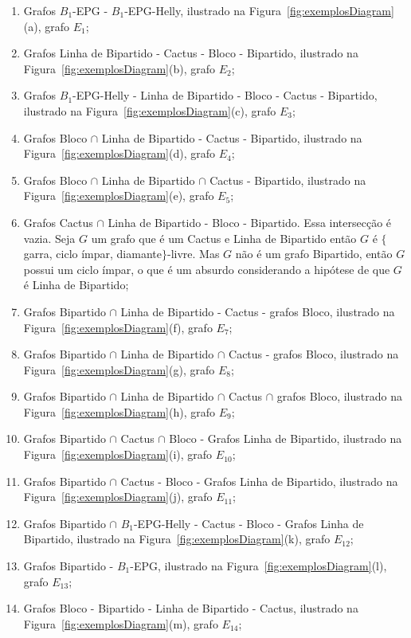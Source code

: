 \begin{enumerate}[label=(\arabic*)]
    \item Grafos $B_1$-EPG  - $B_1$-EPG-Helly, ilustrado na Figura~\ref{fig:exemplosDiagram}(a), grafo $E_1$;%
    
    \item Grafos Linha de Bipartido  - Cactus - Bloco - Bipartido, ilustrado na Figura~\ref{fig:exemplosDiagram}(b), grafo $E_2$;%
    \item Grafos $B_1$-EPG-Helly - Linha de Bipartido - Bloco - Cactus - Bipartido, ilustrado na Figura~\ref{fig:exemplosDiagram}(c), grafo $E_3$;%
    \item Grafos Bloco $\cap$ Linha de Bipartido - Cactus - Bipartido, ilustrado na Figura~\ref{fig:exemplosDiagram}(d), grafo $E_4$;%
    \item Grafos Bloco $\cap$ Linha de Bipartido $\cap$  Cactus - Bipartido, ilustrado na Figura~\ref{fig:exemplosDiagram}(e), grafo $E_5$;%
    \item Grafos Cactus $\cap$ Linha de Bipartido - Bloco - Bipartido. Essa intersecção é vazia. Seja $G$ um grafo que é um Cactus e Linha de Bipartido então $G$ é $\{$garra, ciclo ímpar, diamante$\}$-livre. Mas $G$ não é um grafo Bipartido, então $G$ possui um ciclo ímpar, o que é um absurdo considerando a hipótese de que $G$ é Linha de Bipartido; %
    \item Grafos Bipartido $\cap$ Linha de Bipartido  - Cactus - grafos Bloco, ilustrado na Figura~\ref{fig:exemplosDiagram}(f), grafo $E_7$;%
    \item Grafos Bipartido $\cap$ Linha de Bipartido $\cap$  Cactus - grafos Bloco, ilustrado na Figura~\ref{fig:exemplosDiagram}(g), grafo $E_8$;%
    \item Grafos Bipartido $\cap$ Linha de Bipartido $\cap$  Cactus $\cap$ grafos Bloco, ilustrado na Figura~\ref{fig:exemplosDiagram}(h), grafo $E_9$;%
  \item Grafos Bipartido $\cap$  Cactus $\cap$ Bloco - Grafos Linha de Bipartido, ilustrado na Figura~\ref{fig:exemplosDiagram}(i), grafo $E_{10}$;%
    \item Grafos Bipartido  $\cap$  Cactus - Bloco -  Grafos Linha de Bipartido, ilustrado na Figura~\ref{fig:exemplosDiagram}(j), grafo $E_{11}$;%
     \item Grafos Bipartido $\cap$ $B_1$-EPG-Helly - Cactus - Bloco -  Grafos Linha de Bipartido, ilustrado na Figura~\ref{fig:exemplosDiagram}(k), grafo $E_{12}$;%
      \item Grafos Bipartido - $B_1$-EPG, ilustrado na Figura~\ref{fig:exemplosDiagram}(l), grafo $E_{13}$;%
      \item Grafos Bloco - Bipartido - Linha de Bipartido  - Cactus, ilustrado na Figura~\ref{fig:exemplosDiagram}(m), grafo $E_{14}$;%
 

\end{enumerate}
